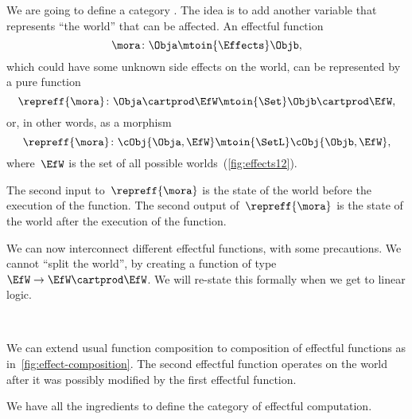 We are going to define a category \Effects.
The idea is to add another variable that represents ``the world'' that can be affected.
An effectful function
%
\begin{equation}\label{eq:Eff-morphism}
    \mora\colon \Obja \mtoin{\Effects} \Objb,
\end{equation}
%
which could have some unknown side effects on the world, can be represented by a pure function
\begin{equation}
    \repreff{\mora}\colon \Obja \cartprod \EfW \mtoin{\Set} \Objb \cartprod \EfW,
\end{equation}\label{eq:Eff-rep-morphism-Set}
or, in other words, as a morphism
\begin{equation}\label{eq:Eff-rep-morphism-SetL}
    \repreff{\mora}\colon \cObj{\Obja,\EfW} \mtoin{\SetL} \cObj{\Objb, \EfW},
\end{equation}
%
where~$\EfW$ is the set of all possible worlds~(\cref{fig:effects12}).

The second input to~$\repreff{\mora}$ is the state of the world before the execution of the function.
The second output of~$\repreff{\mora}$ is the state of the world after the execution of the function.

We can now interconnect different effectful functions, with some precautions.
We cannot ``split the world'', by creating a function of type~$\EfW \to \EfW \cartprod \EfW$.
We will re-state this formally when we get to linear logic.

\begin{marginfigure}
    \centering
    \\
    \caption{}
    \label{fig:effect-composition}
\end{marginfigure}

We can extend usual function composition to composition of effectful functions as in~\cref{fig:effect-composition}.
The second effectful function operates on the world after it was possibly modified by the first effectful function.

We have all the ingredients to define the category \Effects of effectful computation.

